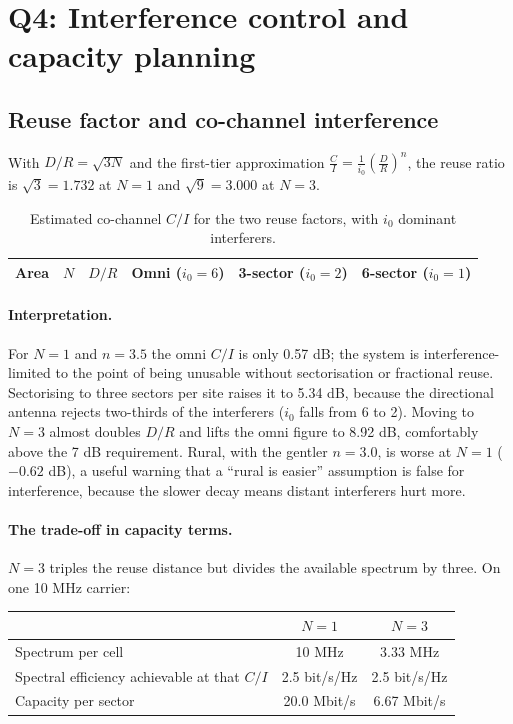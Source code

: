 \documentclass[9pt,a4paper]{article}
\begin{document}
\section{Q4: Interference control and capacity planning}
\label{sec:q4}

\subsection{Reuse factor and co-channel interference}
With $D/R=\sqrt{3N}$ and the first-tier approximation
$\frac{C}{I}=\frac{1}{i_0}\left(\frac{D}{R}\right)^{n}$, the reuse ratio is
$\sqrt{3}=1.732$ at $N=1$ and $\sqrt{9}=3.000$ at $N=3$.

\begin{table}[H]\centering\small
\caption{Estimated co-channel $C/I$ for the two reuse factors, with $i_0$ dominant interferers.}
\label{tab:reuse}
\begin{tabular}{@{}lccccc@{}}
\toprule
\textbf{Area} & $N$ & $D/R$ & \textbf{Omni} ($i_0=6$) & \textbf{3-sector} ($i_0=2$) & \textbf{6-sector} ($i_0=1$) \\
\midrule
\bottomrule
\end{tabular}
\end{table}

\paragraph{Interpretation.} For $N=1$ and $n=3.5$ the omni $C/I$ is only 0.57 dB; the system is
interference-limited to the point of being unusable without sectorisation or fractional reuse.
Sectorising to three sectors per site raises it to 5.34 dB, because the directional antenna
rejects two-thirds of the interferers ($i_0$ falls from 6 to 2). Moving to $N=3$ almost doubles
$D/R$ and lifts the omni figure to 8.92 dB, comfortably above the 7 dB requirement. Rural, with
the gentler $n=3.0$, is worse at $N=1$ ($-0.62$ dB), a useful warning that a ``rural is
easier'' assumption is false for interference, because the slower decay means distant interferers
hurt more.

\paragraph{The trade-off in capacity terms.} $N=3$ triples the reuse distance but divides the
available spectrum by three. On one 10 MHz carrier:

\begin{center}\small
\begin{tabular}{@{}lcc@{}}
\toprule
& $N=1$ & $N=3$ \\
\midrule
Spectrum per cell & 10 MHz & 3.33 MHz \\
Spectral efficiency achievable at that $C/I$ & 2.5 bit/s/Hz & 2.5 bit/s/Hz \\
Capacity per sector & 20.0 Mbit/s & 6.67 Mbit/s \\
\bottomrule
\end{tabular}
\end{center}
\end{document}
